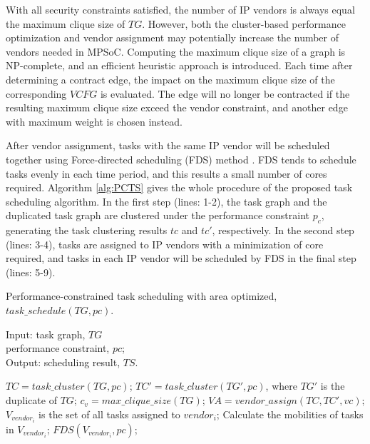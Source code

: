 \documentclass[10pt,journal]{IEEEtran}
\begin{document}
With all security constraints satisfied, the number of IP vendors is always equal the maximum clique size of $TG$. However, both the cluster-based performance optimization and vendor assignment may potentially increase the number of vendors needed in MPSoC. Computing the maximum clique size of a graph is NP-complete, and an efficient heuristic approach \cite{article:CL} is introduced. Each time after determining a contract edge, the impact on the maximum clique size of the corresponding $VCFG$ is evaluated. The edge will no longer be contracted if the resulting maximum clique size exceed the vendor constraint, and another edge with maximum weight is chosen instead.

After vendor assignment, tasks with the same IP vendor will be scheduled together using Force-directed scheduling (FDS) method \cite{article:PP}. FDS tends to schedule tasks evenly in each time period, and this results a small number of cores required. Algorithm \ref{alg:PCTS} gives the whole procedure of the proposed task scheduling algorithm. In the first step (lines: 1-2), the task graph and the duplicated task graph are clustered under the performance constraint $p_c$, generating the task clustering results $tc$ and $tc'$, respectively. In the second step (lines: 3-4), tasks are assigned to IP vendors with a minimization of core required, and tasks in each IP vendor will be scheduled by FDS in the final step (lines: 5-9).


\begin{algorithm}[!h]
\caption{Performance-constrained task scheduling with area optimized, $task\_schedule(TG, pc)$.}
\label{alg:PCTS}
{Input:} task graph, $TG$\\
\hspace*{2.8em}performance constraint, $pc$;\\
{Output:} scheduling result, $TS$.
\begin{algorithmic}[1]
\STATE $TC=task\_cluster(TG,pc)$;
\STATE $TC'=task\_cluster(TG',pc)$, where $TG'$ is the duplicate of $TG$;
\STATE $c_v=max\_clique\_size(TG)$;
\STATE $VA=vendor\_assign(TC, TC', vc)$;
    \STATE $V_{vendor_i}$ is the set of all tasks assigned to $vendor_i$;
    \STATE Calculate the mobilities of tasks in $V_{vendor_i}$;
    \STATE $FDS(V_{vendor_i}, pc)$;%
\ENDFOR
\end{algorithmic}
\end{algorithm}
\end{document}
